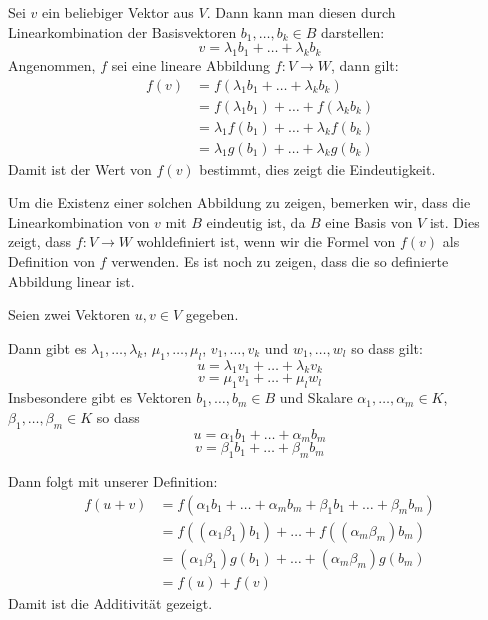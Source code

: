 \beweis
Sei $v$ ein beliebiger Vektor aus $V$. Dann kann man diesen durch Linearkombination der Basisvektoren $b_1,\ldots,b_k \in B$ darstellen:
\begin{equation*}
  v=\lambda_1b_1+\ldots+\lambda_kb_k
\end{equation*}
Angenommen, $f$ sei eine lineare Abbildung $f:V\rightarrow W$, dann gilt:
\begin{align*}
  f(v) &= f(\lambda_1b_1+\ldots+\lambda_kb_k)\\
  &= f(\lambda_1b_1)+\ldots+f(\lambda_kb_k)\\
  &= \lambda_1f(b_1)+\ldots+\lambda_kf(b_k)\\
  &= \lambda_1g(b_1)+\ldots+\lambda_kg(b_k)
\end{align*}
Damit ist der Wert von $f(v)$ bestimmt, dies zeigt die Eindeutigkeit.
\par\medskip
Um die Existenz einer solchen Abbildung zu zeigen, bemerken wir, dass die Linearkombination von $v$ mit $B$ eindeutig ist, da $B$ eine Basis von $V$ ist.
Dies zeigt, dass $f:V\rightarrow W$ wohldefiniert ist, wenn wir die Formel von $f(v)$ als Definition von $f$ verwenden.
Es ist noch zu zeigen, dass die so definierte Abbildung linear ist.
\par\smallskip
Seien zwei Vektoren $u,v\in V$ gegeben.

Dann gibt es $\lambda_1,\ldots,\lambda_k$, $\mu_1,\ldots,\mu_l$, $v_1,\ldots,v_k$ und $w_1,\ldots,w_l$ so dass gilt:
\begin{equation*}
  u=\lambda_1v_1 + \ldots + \lambda_kv_k
\end{equation*}
\begin{equation*}
  v=\mu_1v_1 + \ldots + \mu_lw_l
\end{equation*}
Insbesondere gibt es Vektoren $b_1,\ldots,b_m \in B$ und Skalare $\alpha_1,\ldots,\alpha_m \in K$, $\beta_1,\ldots,\beta_m \in K$ so dass
\begin{equation*}
  u=\alpha_1b_1 + \ldots + \alpha_mb_m
\end{equation*}
\begin{equation*}
  v=\beta_1b_1 + \ldots + \beta_mb_m
\end{equation*}

Dann folgt mit unserer Definition:
\begin{align*}
  f(u+v) &= f(\alpha_1b_1 + \ldots + \alpha_mb_m + \beta_1b_1 + \ldots + \beta_mb_m)\\
  &= f((\alpha_1\beta_1)b_1)+\ldots+f((\alpha_m\beta_m)b_m)\\
  &= (\alpha_1\beta_1)g(b_1)+\ldots+(\alpha_m\beta_m)g(b_m)\\
  &= f(u)+f(v)
\end{align*}
Damit ist die Additivität gezeigt.

